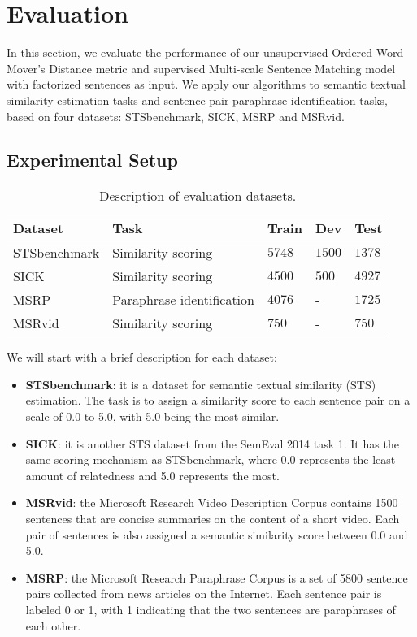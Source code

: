 \section{Evaluation}
\label{sec:eval}

In this section, we evaluate the performance of our unsupervised Ordered Word Mover's Distance metric and supervised Multi-scale Sentence Matching model with factorized sentences as input. We apply our algorithms to semantic textual similarity estimation tasks and sentence pair paraphrase identification tasks, based on four datasets: STSbenchmark, SICK, MSRP and MSRvid. 

\subsection{Experimental Setup}
\label{subsec:setup}


\begin{table}[tb]
  \caption{Description of evaluation datasets.}
  \label{tab:datasets}
  \begin{tabular}{lllll}
    \toprule
    Dataset & Task & Train & Dev & Test\\
    \midrule
    STSbenchmark & Similarity scoring & $5748$ & $1500$ & $1378$ \\
    SICK & Similarity scoring & $4500$ & $500$ & $4927$ \\
    MSRP & Paraphrase identification & $4076$ & - & $1725$ \\
    MSRvid & Similarity scoring & $750$ & - & $750$ \\
    \bottomrule
  \end{tabular}
  \vspace{-2mm}
\end{table}

We will start with a brief description for each dataset:
\begin{itemize}
\item \textbf{STSbenchmark}\cite{cer2017semeval}: it is a dataset for semantic textual similarity (STS) estimation. The task is to assign a similarity score to each sentence pair on a scale of 0.0 to 5.0, with 5.0 being the most similar.

\item \textbf{SICK}\cite{marelli2014sick}: it is another STS dataset from the SemEval 2014 task 1. It has the same scoring mechanism as STSbenchmark, where 0.0 represents the least amount of relatedness and 5.0 represents the most.

\item \textbf{MSRvid}: the Microsoft Research Video Description Corpus contains 1500 sentences that are concise summaries on the content of a short video. Each pair of sentences is also assigned a semantic similarity score between 0.0 and 5.0. 

\item \textbf{MSRP}\cite{quirk2004monolingual}: the Microsoft Research Paraphrase Corpus is a set of 5800 sentence pairs collected from news articles on the Internet. Each sentence pair is labeled 0 or 1, with 1 indicating that the two sentences are paraphrases of each other.
\end{itemize}

